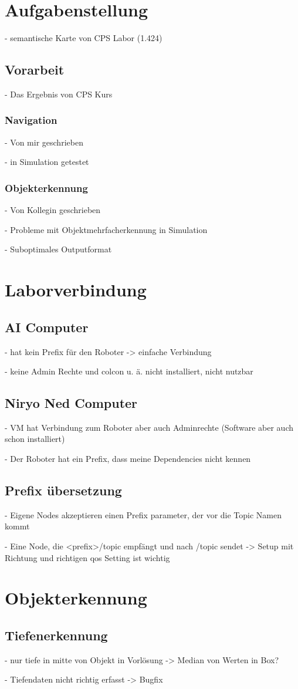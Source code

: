 \section{Aufgabenstellung}
- semantische Karte von CPS Labor (1.424)
\subsection{Vorarbeit}
- Das Ergebnis von CPS Kurs
\subsubsection{Navigation}
- Von mir geschrieben

- in Simulation getestet
\subsubsection{Objekterkennung}
- Von Kollegin geschrieben

- Probleme mit Objektmehrfacherkennung in Simulation

- Suboptimales Outputformat

\section{Laborverbindung}
\subsection{AI Computer}
- hat kein Prefix für den Roboter -> einfache Verbindung

- keine Admin Rechte und colcon u. ä. nicht installiert, nicht nutzbar

\subsection{Niryo Ned Computer}
- VM hat Verbindung zum Roboter aber auch Adminrechte (Software aber auch schon installiert)

- Der Roboter hat ein Prefix, dass meine Dependencies nicht kennen

\subsection{Prefix übersetzung}
- Eigene Nodes akzeptieren einen Prefix parameter, der vor die Topic Namen kommt

- Eine Node, die <prefix>/topic empfängt und nach /topic sendet
-> Setup mit Richtung und richtigen qos Setting ist wichtig
\section{Objekterkennung}
\subsection{Tiefenerkennung}
- nur tiefe in mitte von Objekt in Vorlösung
-> Median von Werten in Box?

- Tiefendaten nicht richtig erfasst
-> Bugfix
